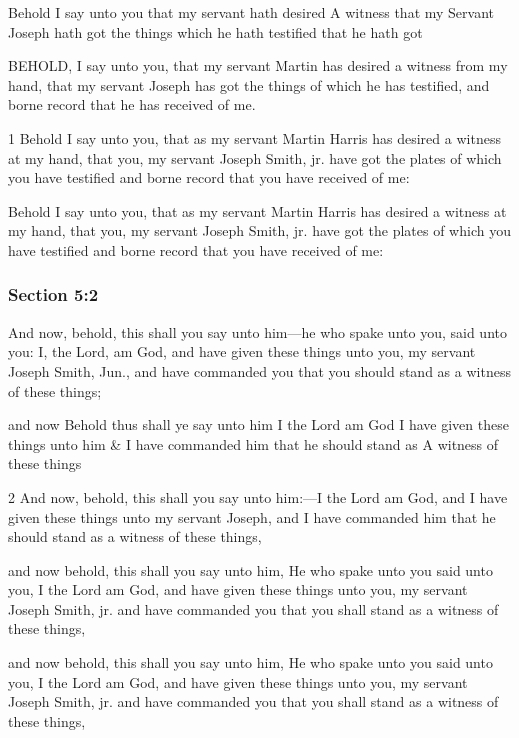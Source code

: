 		\begin{framed}
		\scriptsize
			\begin{compactdesc}
				\item[JSP] Behold I say unto you that my servant hath desired A witness that my Servant Joseph hath got the things which he hath testified that he hath got
				\item[RB1] [\textit{missing}]
				\item[BC] BEHOLD, I say unto you, that my servant Martin has desired a witness from my hand, that my servant Joseph has got the things of which he has testified, and borne record that he has received of me.
				\item[DC 1835] 1 Behold I say unto you, that as my servant Martin Harris has desired a witness at my hand, that you, my servant Joseph Smith, jr. have got the plates of which you have testified and borne record that you have received of me:
				\item[DC 1844] Behold I say unto you, that as my servant Martin Harris has desired a witness at my hand, that you, my servant Joseph Smith, jr. have got the plates of which you have testified and borne record that you have received of me:
			\end{compactdesc}
		\end{framed}

	\subsubsection{Section 5:2} %
		\label{DC5-2}

		And now, behold, this shall you say unto him---he who spake unto you, said unto you: I, the Lord, am God, and have given these things unto you, my servant Joseph Smith, Jun., and have commanded you that you should stand as a witness of these things;

		\begin{framed}
		\scriptsize
			\begin{compactdesc}
				\item[JSP] and now Behold thus shall ye say unto him I the Lord am God I have given these things unto him \& I have commanded him that he should stand as A witness of these things
				\item[RB1] [\textit{missing}]
				\item[BC] 2 And now, behold, this shall you say unto him:---I the Lord am God, and I have given these things unto my servant Joseph, and I have commanded him that he should stand as a witness of these things, 
				\item[DC 1835] and now behold, this shall you say unto him, He who spake unto you said unto you, I the Lord am God, and have given these things unto you, my servant Joseph Smith, jr. and have commanded you that you shall stand as a witness of these things,
				\item[DC 1844] and now behold, this shall you say unto him, He who spake unto you said unto you, I the Lord am God, and have given these things unto you, my servant Joseph Smith, jr. and have commanded you that you shall stand as a witness of these things,
			\end{compactdesc}
		\end{framed}

